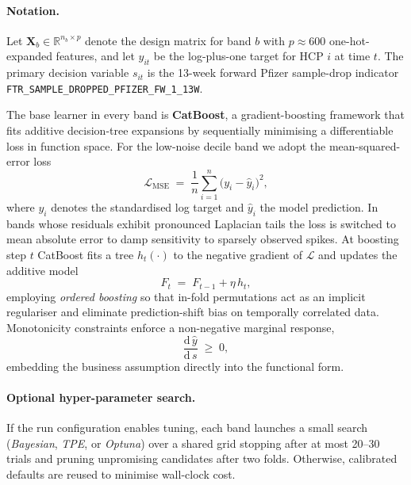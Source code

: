 \paragraph{Notation.}
Let \(\mathbf X_b\in\mathbb R^{n_b\times p}\) denote the design matrix for band \(b\) with \(p\approx600\) one-hot-expanded features, and let \(y_{it}\) be the log-plus-one target for HCP \(i\) at time \(t\). The primary decision variable \(s_{it}\) is the 13-week forward Pfizer sample-drop indicator \texttt{FTR\_SAMPLE\_DROPPED\_PFIZER\_FW\_1\_13W}.

The base learner in every band is \textbf{CatBoost}, a gradient-boosting framework that fits additive decision-tree expansions by sequentially minimising a differentiable loss in function space. For the low-noise decile band we adopt the mean-squared-error loss
\[
  \mathcal{L}_{\mathrm{MSE}}
  \;=\;
  \frac{1}{n}\sum_{i=1}^{n}
    \bigl(y_i - \hat y_i\bigr)^{2},
\]
where \(y_i\) denotes the standardised log target and \(\hat y_i\) the model prediction. In bands whose residuals exhibit pronounced Laplacian tails the loss is switched to mean absolute error to damp sensitivity to sparsely observed spikes. At boosting step \(t\) CatBoost fits a tree \(h_t(\cdot)\) to the negative gradient of \(\mathcal{L}\) and updates the additive model
\[
  F_{t} \;=\; F_{t-1} + \eta\,h_t,
\]
employing \emph{ordered boosting} so that in-fold permutations act as an implicit regulariser and eliminate prediction-shift bias on temporally correlated data. Monotonicity constraints enforce a non-negative marginal response,
\[
  \frac{\mathrm{d}\,\hat y}{\mathrm{d}\,s} \;\ge\; 0,
\]
embedding the business assumption directly into the functional form.

\paragraph{Optional hyper-parameter search.}
If the run configuration enables tuning, each band launches a small search (\emph{Bayesian}, \emph{TPE}, or \emph{Optuna}) over a shared grid stopping after at most 20--30 trials and pruning unpromising candidates after two folds. Otherwise, calibrated defaults are reused to minimise wall-clock cost.

